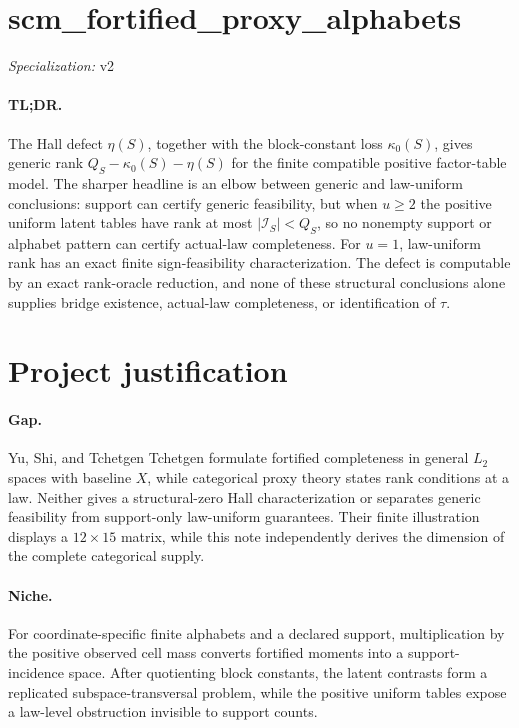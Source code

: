 \documentclass{article}
\begin{document}
\sloppy

\section*{scm\_\allowbreak{}fortified\_\allowbreak{}proxy\_\allowbreak{}alphabets}

\noindent\textit{Specialization:} v2\par

\paragraph{TL;DR.} The Hall defect \(\eta(S)\), together with the block-constant loss \(\kappa_0(S)\), gives generic rank \(Q_S-\kappa_0(S)-\eta(S)\) for the finite compatible positive factor-table model. The sharper headline is an elbow between generic and law-uniform conclusions: support can certify generic feasibility, but when \(u\geq2\) the positive uniform latent tables have rank at most \(|\mathcal I_S|<Q_S\), so no nonempty support or alphabet pattern can certify actual-law completeness. For \(u=1\), law-uniform rank has an exact finite sign-feasibility characterization. The defect is computable by an exact rank-oracle reduction, and none of these structural conclusions alone supplies bridge existence, actual-law completeness, or identification of \(\tau\).

\section{Project justification}

\paragraph{Gap.} Yu, Shi, and Tchetgen Tchetgen formulate fortified completeness in general \(L_2\) spaces with baseline \(X\), while categorical proxy theory states rank conditions at a law. Neither gives a structural-zero Hall characterization or separates generic feasibility from support-only law-uniform guarantees. Their finite illustration displays a \(12\times15\) matrix, while this note independently derives the dimension of the complete categorical supply.

\paragraph{Niche.} For coordinate-specific finite alphabets and a declared support, multiplication by the positive observed cell mass converts fortified moments into a support-incidence space. After quotienting block constants, the latent contrasts form a replicated subspace-transversal problem, while the positive uniform tables expose a law-level obstruction invisible to support counts.
\end{document}
